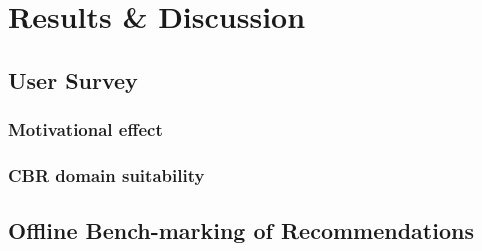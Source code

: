 
\chapter{Results \& Discussion}



\section{User Survey}


\subsection{Motivational effect}


\subsection{CBR domain suitability}




\section{Offline Bench-marking of Recommendations}


